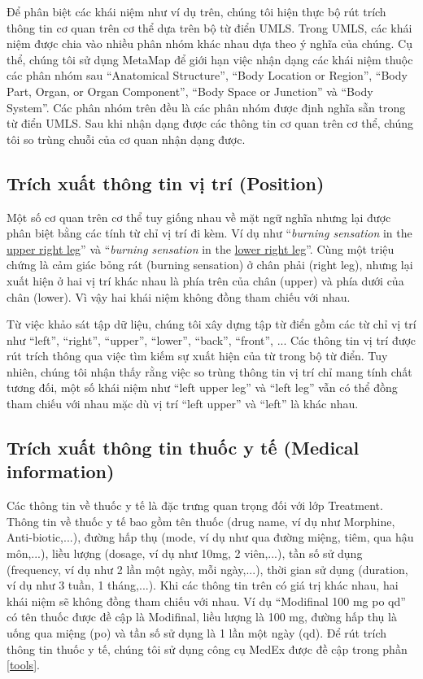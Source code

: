 Để phân biệt các khái niệm như ví dụ trên, chúng tôi hiện thực bộ rút trích thông tin cơ quan trên cơ thể dựa trên bộ từ điển UMLS. Trong UMLS, các khái niệm được chia vào nhiều phân nhóm khác nhau dựa theo ý nghĩa của chúng. Cụ thể, chúng tôi sử dụng MetaMap để giới hạn việc nhận dạng các khái niệm thuộc các phân nhóm sau ``Anatomical Structure'', ``Body Location or Region'', ``Body Part, Organ, or Organ Component'', ``Body Space or Junction'' và ``Body System''. Các phân nhóm trên đều là các phân nhóm được định nghĩa sẵn trong từ điển UMLS. Sau khi nhận dạng được các thông tin cơ quan trên cơ thể, chúng tôi so trùng chuỗi của cơ quan nhận dạng được.

\subsection*{Trích xuất thông tin vị trí (Position)}
Một số cơ quan trên cơ thể tuy giống nhau về mặt ngữ nghĩa nhưng lại được phân biệt bằng các tính từ chỉ vị trí đi kèm. Ví dụ như ``\textit{burning sensation} in the \underline{upper right leg}'' và ``\textit{burning sensation} in the \underline{lower right leg}''. Cùng một triệu chứng là cảm giác bỏng rát (burning sensation) ở chân phải (right leg), nhưng lại xuất hiện ở hai vị trí khác nhau là phía trên của chân (upper) và phía dưới của chân (lower). Vì vậy hai khái niệm không đồng tham chiếu với nhau.

Từ việc khảo sát tập dữ liệu, chúng tôi xây dựng tập từ điển gồm các từ chỉ vị trí như ``left'', ``right'', ``upper'', ``lower'', ``back'', ``front'', ... Các thông tin vị trí được rút trích thông qua việc tìm kiếm sự xuất hiện của từ trong bộ từ điển. Tuy nhiên, chúng tôi nhận thấy rằng việc so trùng thông tin vị trí chỉ mang tính chất tương đối, một số khái niệm như ``left upper leg'' và ``left leg'' vẫn có thể đồng tham chiếu với nhau mặc dù vị trí ``left upper'' và ``left'' là khác nhau.

\subsection*{Trích xuất thông tin thuốc y tế (Medical information)}
Các thông tin về thuốc y tế là đặc trưng quan trọng đối với lớp Treatment. Thông tin về thuốc y tế bao gồm tên thuốc (drug name, ví dụ như Morphine, Anti-biotic,...), đường hấp thụ (mode, ví dụ như qua đường miệng, tiêm, qua hậu môn,...), liều lượng (dosage, ví dụ như 10mg, 2 viên,...), tần số sử dụng (frequency, ví dụ như 2 lần một ngày, mỗi ngày,...), thời gian sử dụng (duration, ví dụ như 3 tuần, 1 tháng,...). Khi các thông tin trên có giá trị khác nhau, hai khái niệm sẽ không đồng tham chiếu với nhau. Ví dụ ``Modifinal 100 mg po qd'' có tên thuốc được đề cập là Modifinal, liều lượng là 100 mg, đường hấp thụ là uống qua miệng (po) và tần số sử dụng là 1 lần một ngày (qd). Để rút trích thông tin thuốc y tế, chúng tôi sử dụng công cụ MedEx được đề cập trong phần \ref{tools}.

